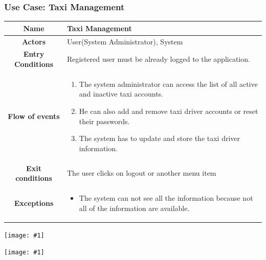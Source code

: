 \documentclass[11pt, a4paper,titlepage]{article}
\newcommand{\image}[1]{
	\begin{center}
		\noindent \texttt{[image: \#1]}
	\end{center}
	}
\begin{document}
\subsubsection{Use Case: Taxi Management}
		\begin{tabularx}{\textwidth}{| c | X |}
			\hline
			\textbf{Name} & 
			Taxi Management
			\\
			\hline
			\textbf{Actors} & 
			User(System Administrator), System  
			\\
			\hline
			\textbf{Entry Conditions} &
			Registered user must be already logged to the application. 
			\\
			\hline
			\textbf{Flow of events} & 
			\begin{enumerate}
				\item The system administrator can access the list of all active and inactive taxi accounts. 
				\item He can also add and remove taxi driver accounts or reset their passwords.
				\item The system has to update and store the taxi driver information.
			\end{enumerate}						
			\\
			\hline
			\textbf{Exit conditions} & 
			The user clicks on logout or another menu item
			\\
			\hline
			\textbf{Exceptions} & 
			\begin{itemize}
				\item The system can not see all the information because not all of the information are available.
			\end{itemize} 
			\\
			\hline		
		\end{tabularx}
		\image{usecase_taxi_management.png}
		\image{diagram_sequence_taxi_management.png}
		\newpage
\end{document}
